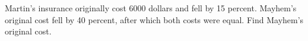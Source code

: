 Martin's insurance originally cost 6000 dollars and fell by 15 percent. Mayhem's original cost fell by 40 percent, after which both costs were equal. Find Mayhem's original cost.
